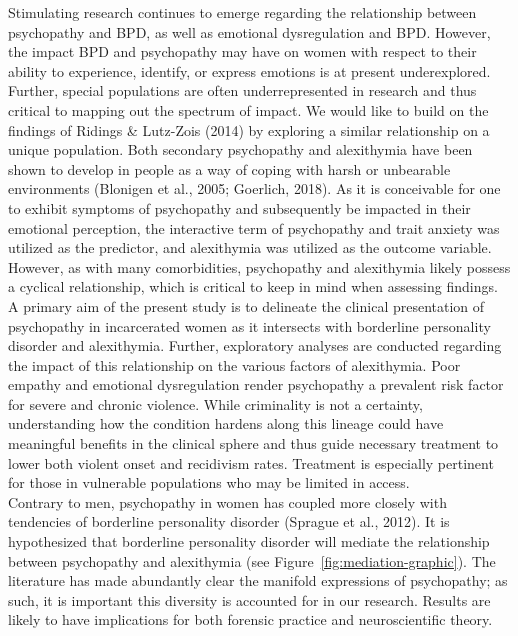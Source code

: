 \documentclass[
  man,floatsintext]{apa7}
\begin{document}
Stimulating research continues to emerge regarding the relationship between psychopathy and BPD, as well as emotional dysregulation and BPD. However, the impact BPD and psychopathy may have on women with respect to their ability to experience, identify, or express emotions is at present underexplored. Further, special populations are often underrepresented in research and thus critical to mapping out the spectrum of impact. We would like to build on the findings of Ridings \& Lutz-Zois (2014) by exploring a similar relationship on a unique population. Both secondary psychopathy and alexithymia have been shown to develop in people as a way of coping with harsh or unbearable environments (Blonigen et al., 2005; Goerlich, 2018). As it is conceivable for one to exhibit symptoms of psychopathy and subsequently be impacted in their emotional perception, the interactive term of psychopathy and trait anxiety was utilized as the predictor, and alexithymia was utilized as the outcome variable. However, as with many comorbidities, psychopathy and alexithymia likely possess a cyclical relationship, which is critical to keep in mind when assessing findings. A primary aim of the present study is to delineate the clinical presentation of psychopathy in incarcerated women as it intersects with borderline personality disorder and alexithymia. Further, exploratory analyses are conducted regarding the impact of this relationship on the various factors of alexithymia. Poor empathy and emotional dysregulation render psychopathy a prevalent risk factor for severe and chronic violence. While criminality is not a certainty, understanding how the condition hardens along this lineage could have meaningful benefits in the clinical sphere and thus guide necessary treatment to lower both violent onset and recidivism rates. Treatment is especially pertinent for those in vulnerable populations who may be limited in access.\\
Contrary to men, psychopathy in women has coupled more closely with tendencies of borderline personality disorder (Sprague et al., 2012). It is hypothesized that borderline personality disorder will mediate the relationship between psychopathy and alexithymia (see Figure~\ref{fig:mediation-graphic}). The literature has made abundantly clear the manifold expressions of psychopathy; as such, it is important this diversity is accounted for in our research. Results are likely to have implications for both forensic practice and neuroscientific theory.
\end{document}
